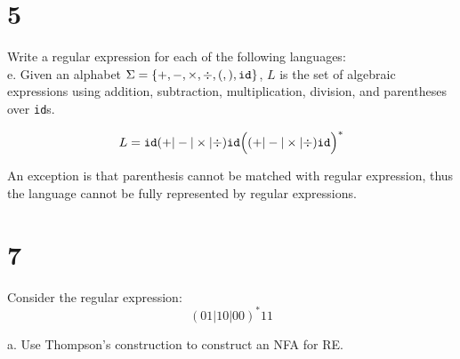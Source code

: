 \documentclass[11pt]{article}
\begin{document}
\newpage

\section*{5}
Write a regular expression for each of the following languages: \\

e. Given an alphabet $\Sigma = \{+, -, \times, \div, (,), \verb|id|\}$, $L$ is the set of algebraic expressions using addition, subtraction, multiplication, division, and parentheses over \verb|id|s.

\begin{Answer}
	$$L = \verb|id|(+ | - | \times | \div)\verb|id|\Big((+ | - | \times | \div)\verb|id|\Big)^*$$

	An exception is that parenthesis cannot be matched with regular expression, thus the language cannot be fully represented by regular expressions.
\end{Answer}

\newpage

\section*{7}
Consider the regular expression:
$$(01 | 10 | 00)^* 11$$

a. Use Thompson's construction to construct an NFA for RE.
\end{document}

